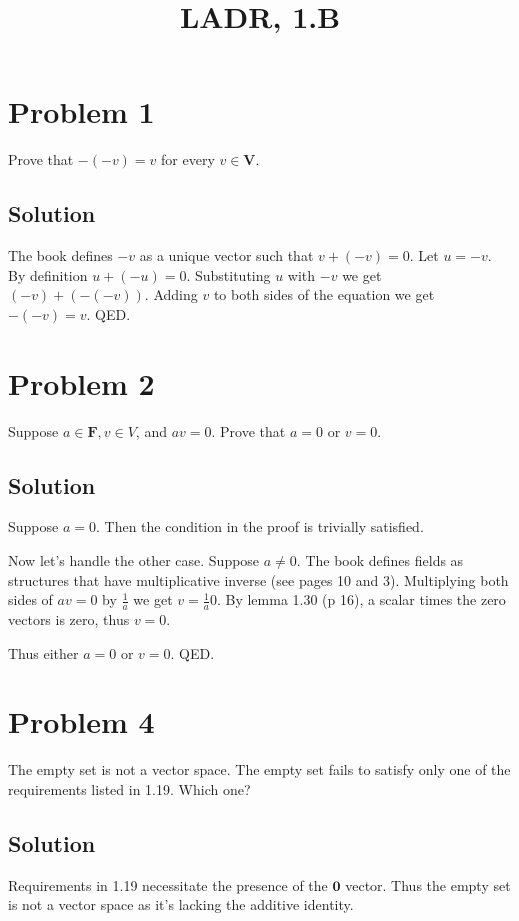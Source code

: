 \documentclass{article}
\title{LADR, 1.B}
\begin{document}
\maketitle

\section*{Problem 1}
Prove that $-(-v)=v$ for every $v\in \mathbf{V}$.

\subsection*{Solution}
The book defines $-v$ as a unique vector such that $v+(-v)=0$. Let $u=-v$. By definition $u+(-u)=0$. Substituting $u$ with $-v$ we get $(-v)+(-(-v))$. Adding $v$ to both sides of the equation we get $-(-v)=v$. QED.

\section*{Problem 2}
Suppose $a\in\mathbf{F}, v\in V$, and $av=0$. Prove that $a=0$ or $v=0$.

\subsection*{Solution}
Suppose $a=0$. Then the condition in the proof is trivially satisfied.

Now let's handle the other case. Suppose $a\neq 0$. The book defines fields as structures that have multiplicative inverse (see pages 10 and 3). Multiplying both sides of $av=0$ by $\frac{1}{a}$ we get $v=\frac{1}{a}0$. By lemma 1.30 (p 16), a scalar times the zero vectors is zero, thus $v=0$.

\vs

Thus either $a=0$ or $v=0$. QED.

\section*{Problem 4}
The empty set is not a vector space. The empty set fails to satisfy only one of the requirements listed in 1.19. Which one?

\subsection*{Solution}
Requirements in 1.19 necessitate the presence of the $\mathbf{0}$ vector. Thus the empty set is not a vector space as it's lacking the additive identity.
\end{document}

